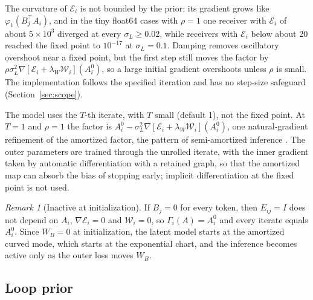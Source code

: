 \documentclass[11pt]{article}
\theoremstyle{definition}
\theoremstyle{remark}
\newtheorem{remark}[theorem]{Remark}
\begin{document}
The curvature of $\mathcal E_i$ is not bounded by the prior: its gradient grows like $\varphi_1(B_j^\top A_i)$, and in the tiny float64 cases with $\rho=1$ one receiver with $\mathcal E_i$ of about $5\times10^3$ diverged at every $\sigma_L\ge0.02$, while receivers with $\mathcal E_i$ below about 20 reached the fixed point to $10^{-17}$ at $\sigma_L=0.1$. Damping removes oscillatory overshoot near a fixed point, but the first step still moves the factor by $\rho\sigma_L^2\nabla[\mathcal E_i+\lambda_W\mathcal W_i](A_i^0)$, so a large initial gradient overshoots unless $\rho$ is small. The implementation follows the specified iteration and has no step-size safeguard (Section~\ref{sec:scope}).

The model uses the $T$-th iterate, with $T$ small (default 1), not the fixed point. At $T=1$ and $\rho=1$ the factor is $A_i^0-\sigma_L^2\nabla[\mathcal E_i+\lambda_W\mathcal W_i](A_i^0)$, one natural-gradient refinement of the amortized factor, the pattern of semi-amortized inference \citep{Kim2018SemiAmortized}. The outer parameters are trained through the unrolled iterate, with the inner gradient taken by automatic differentiation with a retained graph, so that the amortized map can absorb the bias of stopping early; implicit differentiation at the fixed point is not used.

\begin{remark}[Inactive at initialization]
\label{rem:latent_init}
If $B_j=0$ for every token, then $E_{ij}=I$ does not depend on $A_i$, $\nabla\mathcal E_i=0$ and $\mathcal W_i=0$, so $\Gamma_i(A)=A_i^0$ and every iterate equals $A_i^0$. Since $W_B=0$ at initialization, the latent model starts at the amortized curved mode, which starts at the exponential chart, and the inference becomes active only as the outer loss moves $W_B$.
\end{remark}

\subsection{Loop prior}
\label{sec:loops}
\end{document}

